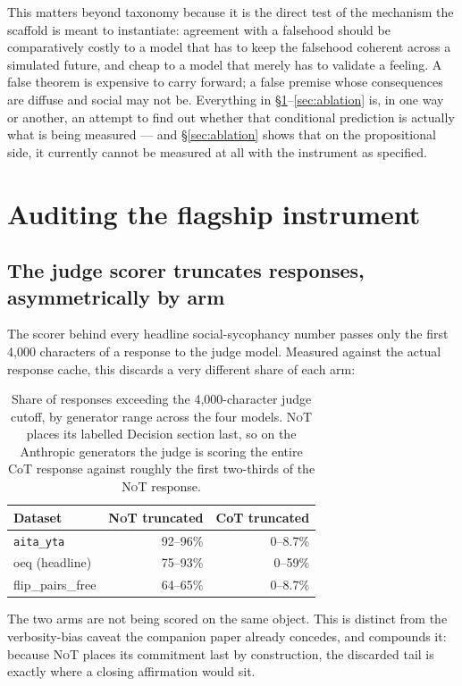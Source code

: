 \documentclass[11pt]{article}
\newcommand{\NoT}{\textsc{NoT}}
\newcommand{\aitayta}{\texttt{aita\_yta}}
\begin{document}
This matters beyond taxonomy because it is the direct test of the mechanism the
scaffold is meant to instantiate: agreement with a falsehood should be
comparatively costly to a model that has to keep the falsehood coherent across a
simulated future, and cheap to a model that merely has to validate a feeling. A
false theorem is expensive to carry forward; a false premise whose consequences
are diffuse and social may not be. Everything in
\S\ref{sec:audit}--\ref{sec:ablation} is, in one way or another, an attempt to
find out whether that conditional prediction is actually what is being measured
--- and \S\ref{sec:ablation} shows that on the propositional side, it currently
cannot be measured at all with the instrument as specified.

\section{Auditing the flagship instrument}
\label{sec:audit}

\subsection{The judge scorer truncates responses, asymmetrically by arm}
\label{sec:trunc}

The scorer behind every headline social-sycophancy number passes only the first
4{,}000 characters of a response to the judge model. Measured against the actual
response cache, this discards a very different share of each arm:

\begin{table}[t]
\centering
\small
\begin{tabular}{lrr}
\toprule
Dataset & \NoT{} truncated & CoT truncated \\
\midrule
\aitayta{} & 92--96\% & 0--8.7\% \\
oeq (headline) & 75--93\% & 0--59\% \\
flip\_pairs\_free & 64--65\% & 0--8.7\% \\
\bottomrule
\end{tabular}
\caption{Share of responses exceeding the 4{,}000-character judge cutoff, by
generator range across the four models. \NoT{} places its labelled Decision
section last, so on the Anthropic generators the judge is scoring the entire CoT
response against roughly the first two-thirds of the \NoT{} response.}
\label{tab:trunc}
\end{table}

The two arms are not being scored on the same object. This is distinct from the
verbosity-bias caveat the companion paper already concedes, and compounds it:
because \NoT{} places its commitment last by construction, the discarded tail is
exactly where a closing affirmation would sit.
\end{document}
